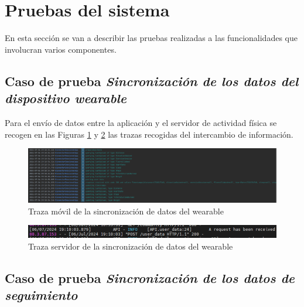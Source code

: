             \clearpage  %

    \section{Pruebas del sistema}
        En esta sección se van a describir las pruebas realizadas a las funcionalidades que involucran varios componentes.
        
        \subsection*{Caso de prueba \textit{Sincronización de los datos del dispositivo wearable}}

            Para el envío de datos entre la aplicación y el servidor de actividad física se recogen en las Figuras \ref{figure:pruebas:sincronizacion_wearable:movil} y \ref{figure:pruebas:sincronizacion_wearable:servidor} las trazas recogidas del intercambio de información.

            \begin{figure}[h]
                \centering
                \includegraphics[width=1\textwidth]{figures/pruebas/sincro_wearable/Traza movil.png}
                \caption{Traza móvil de la sincronización de datos del wearable}
                \label{figure:pruebas:sincronizacion_wearable:movil}
            \end{figure}

            \begin{figure}[h]
                \centering
                \includegraphics[width=1\textwidth]{figures/pruebas/sincro_wearable/Traza servidor.png}
                \caption{Traza servidor de la sincronización de datos del wearable}
                \label{figure:pruebas:sincronizacion_wearable:servidor}
            \end{figure}

    
        \subsection*{Caso de prueba \textit{Sincronización de los datos de seguimiento}}

